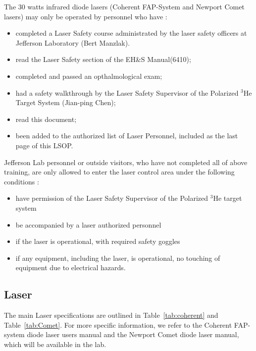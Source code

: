 {The 30 watts infrared diode lasers (Coherent FAP-System and Newport Comet lasers) may only be operated by
personnel who have :
\begin {itemize}
\item completed a Laser Safety course administrated by the laser safety officers at
Jefferson Laboratory (Bert Manzlak).
\item read the Laser Safety section of the EH\&S Manual(6410);
\item  completed and passed an opthalmological exam;
\item had a safety walkthrough by the Laser Safety Supervisor of the 
Polarized $^3$He Target System (Jian-ping Chen);
\item read this document;
\item been added to the authorized list of Laser Personnel, included as the 
last page of this LSOP.
\end {itemize}
Jefferson Lab personnel or outside visitors, who have not completed all of 
above training, are
only allowed to enter the laser control area under the following conditions :
\begin {itemize}
\item have permission of the Laser Safety
Supervisor of the Polarized $^3$He target system
\item be accompanied by a laser authorized personnel
\item if the laser is operational, with required safety
goggles
\item if any equipment, including the laser, is operational, no touching of
equipment due to electrical hazards.
\end {itemize}


\subsection{Laser}

The main Laser specifications are outlined in Table~\ref{tab:coherent} and
Table~\ref{tab:Comet}. For more specific
information, we refer to the Coherent FAP-system diode laser users manual
and the Newport Comet diode laser manual, 
which will be available in the lab.

}
